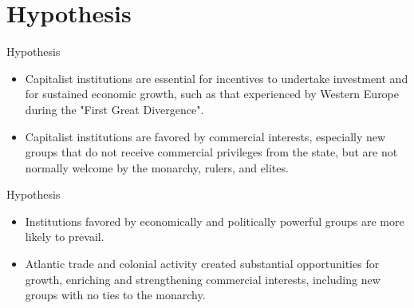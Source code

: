 \documentclass[pdftex,12pt,xcolor=pdftex,table]{beamer}
\theoremstyle{definition}
\theoremstyle{remark}
\numberwithin{equation}{section}
\numberwithin{figure}{section}
\begin{document}
	\section{Hypothesis}
		\begin{frame}{Hypothesis}
			\justifying
			    \begin{itemize}
			        \item Capitalist institutions are essential for incentives to undertake investment and for sustained economic growth, such as that experienced by Western Europe during the "First Great Divergence".
                    \vspace{7mm} 
			        \item Capitalist institutions are favored by commercial interests, especially new groups that do not receive commercial privileges from the state, but are not normally welcome by the monarchy, rulers, and elites.
	    		\end{itemize}
		\end{frame}
        \begin{frame}{Hypothesis}
		    \justifying
			    \begin{itemize}       
			        \item Institutions favored by economically and politically powerful groups are more likely to prevail.
                    \vspace{7mm} 
			        \item Atlantic trade and colonial activity created substantial opportunities for growth, enriching and strengthening commercial interests, including new groups with no ties to the monarchy.
			\end{itemize}
		\end{frame}
	
\end{document}
